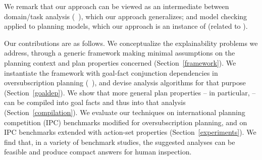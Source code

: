 We remark that our approach can be viewed as an intermediate between
domain/task analysis (\eg\ \cite{fox:long:jair-98}), which our
approach generalizes; and model checking applied to planning models,
which our approach is an instance of (related to
\cite{vaquero:etal:keq-13}). 
%
%


Our contributions are as follows. 
%
%
We conceptualize the explainability problems we address, through a
generic framework making minimal assumptions on the planning context
and plan properties concerned (Section~\ref{framework}). We
instantiate the framework with goal-fact conjunction dependencies in
oversubscription planning
(\eg\ \cite{smith:icaps-04,domshlak:mirkis:jair-15}), and devise
analysis algorithms for that purpose (Section~\ref{goaldep}). We show
that more general plan properties -- in particular,
 -- can be compiled into goal facts and
thus into that analysis (Section~\ref{compilation}). We evaluate our
techniques on international planning competition (IPC) benchmarks
modified for oversubscription planning, and on IPC benchmarks extended
with action-set properties (Section~\ref{experiments}).
%
%
We find that, in a variety of benchmark studies, the suggested
analyses can be feasible and produce compact answers for human
inspection.

